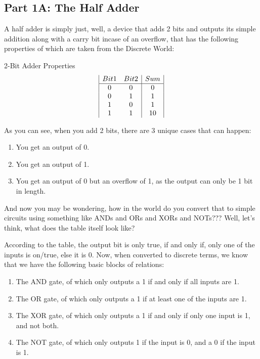 \documentclass{article}
\begin{document}
\subsection{Part 1A: The Half Adder}
\qquad
A half adder is simply just, well, a device that adds 2 bits and outputs its simple addition along with a carry bit incase of an overflow, that has the following properties of which are taken from the Discrete World:
\begin{center}
    2-Bit Adder Properties
    \begin{displaymath}
    \begin{array}{|c c|c|}
    Bit1 & Bit2 & Sum\\
    \hline
    0 & 0 & 0\\
    0 & 1 & 1\\
    1 & 0 & 1\\
    1 & 1 & 10\\
    \end{array}
    \end{displaymath}
\end{center}

As you can see, when you add 2 bits, there are 3 unique cases that can happen:
\begin{enumerate}
      \item You get an output of 0.
      \item You get an output of 1.
      \item You get an output of 0 but an overflow of 1, as the output can only be 1 bit in length.
\end{enumerate}

And now you may be wondering, how in the world do you convert that to simple circuits using something like ANDs and ORs and XORs and NOTs??? Well, let's think, what does the table itself look like? 

According to the table, the output bit is only true, if and only if, only one of the inputs is on/true, else it is 0. Now, when converted to discrete terms, we know that we have the following basic blocks of relations:
\begin{enumerate}
      \item The AND gate, of which only outputs a 1 if and only if all inputs are 1.
      \item The OR gate, of which only outputs a 1 if at least one of the inputs are 1.
      \item The XOR gate, of which only outputs a 1 if and only if only one input is 1, and not both.
      \item The NOT gate, of which only outputs 1 if the input is 0, and a 0 if the input is 1.
\end{enumerate}
\end{document}

